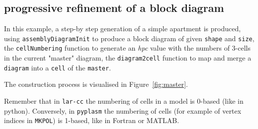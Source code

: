 \documentclass[11pt,oneside]{article}	%
\begin{document}
\subsection{progressive refinement of a block diagram}
\label{sec:master}

In this example, a step-by step generation of a simple apartment is produced, using 
\texttt{assemblyDiagramInit} to produce a block diagram of given \texttt{shape} and 
\texttt{size}, the \texttt{cellNumbering} function to generate an \emph{hpc} value
with the numbers of 3-cells in the current "master" diagram, the \texttt{diagram2cell}
function to map and merge a \texttt{diagram} into a \texttt{cell} of the \texttt{master}.

The construction process is visualised in Figure~\ref{fig:master}.

Remember that in \texttt{lar-cc} the numbering of cells in a model is 0-based (like
in python). Conversely, in \texttt{pyplasm} the numbering of cells (for example of 
vertex indices in \texttt{MKPOL}) is 1-based, like in Fortran or MATLAB.   
\end{document}

